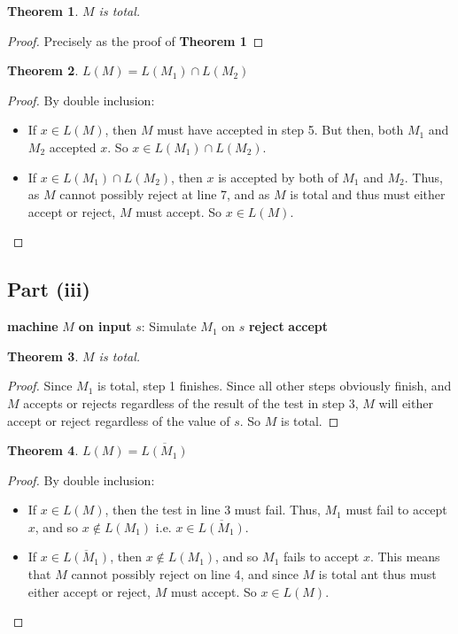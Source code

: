 \documentclass[a4paper,12pt]{scrartcl}
\newcommand{\Machine}[2]{\State \textbf{machine} #1 \textbf{on input} #2:}
\newcommand{\Reject}{\State \textbf{reject}}
\newcommand{\Accept}{\State \textbf{accept}}
\newtheorem{theorem}{Theorem}
\begin{document}
\begin{theorem}
    $M$ is total.
\end{theorem}
\begin{proof}
    Precisely as the proof of \textbf{Theorem 1}
\end{proof}

\begin{theorem}
    $L(M) = L(M_1) \cap L(M_2)$
\end{theorem}
\begin{proof}
    By double inclusion:
    \begin{itemize}
        \item If $x \in L(M)$, then $M$ must have accepted in step 5. But then, both $M_1$ and $M_2$ accepted $x$. So $x \in L(M_1) \cap L(M_2)$.
        \item If $x \in L(M_1) \cap L(M_2)$, then $x$ is accepted by both of $M_1$ and $M_2$. Thus, as $M$ cannot possibly reject at line 7, and as $M$ is total and thus must either accept or reject, $M$ must accept. So $x \in L(M)$.
    \end{itemize}
\end{proof}

\subsection{Part (iii)}
\begin{algorithmic}[1]
    \Machine{$M$}{$s$}
    \State Simulate $M_1$ on $s$
        \Reject
    \Else
        \Accept
    \EndIf
\end{algorithmic}

\begin{theorem}
    $M$ is total.
\end{theorem}
\begin{proof}
    Since $M_1$ is total, step 1 finishes. Since all other steps obviously finish, and $M$ accepts or rejects regardless of the result of the test in step 3, $M$ will either accept or reject regardless of the value of $s$. So $M$ is total.
\end{proof}

\begin{theorem}
    $L(M) = \overline{L(M_1)}$
\end{theorem}
\begin{proof}
    By double inclusion:
    \begin{itemize}
        \item If $x \in L(M)$, then the test in line 3 must fail. Thus, $M_1$ must fail to accept $x$, and so $x \notin L(M_1)$ i.e. $x \in \overline{L(M_1)}$.
        \item If $x \in \overline{L(M_1)}$, then $x \notin L(M_1)$, and so $M_1$ fails to accept $x$. This means that $M$ cannot possibly reject on line 4, and since $M$ is total ant thus must either accept or reject, $M$ must accept. So $x \in L(M)$.
    \end{itemize}
\end{proof}
\end{document}
